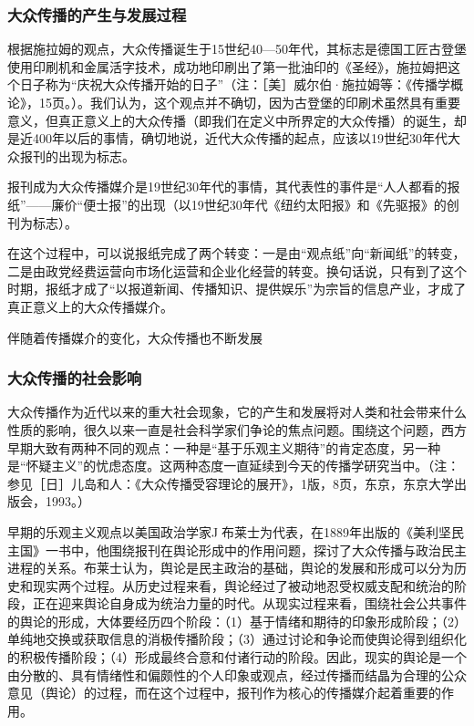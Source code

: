 \documentclass[UTF8,12pt]{ctexart}
\numberwithin{equation}{section} %
\numberwithin{figure}{section}
\numberwithin{table}{section}
\begin{document}
	
	\subsubsection{大众传播的产生与发展过程}
	根据施拉姆的观点，大众传播诞生于15世纪40—50年代，其标志是德国工匠古登堡使用印刷机和金属活字技术，成功地印刷出了第一批油印的《圣经》，施拉姆把这个日子称为“庆祝大众传播开始的日子”（注：［美］威尔伯·施拉姆等：《传播学概论》，15页。）。我们认为，这个观点并不确切，因为古登堡的印刷术虽然具有重要意义，但真正意义上的大众传播（即我们在定义中所界定的大众传播）的诞生，却是近400年以后的事情，确切地说，近代大众传播的起点，应该以19世纪30年代大众报刊的出现为标志。
	
	报刊成为大众传播媒介是19世纪30年代的事情，其代表性的事件是“人人都看的报纸”——廉价“便士报”的出现（以19世纪30年代《纽约太阳报》和《先驱报》的创刊为标志）。
	
	在这个过程中，可以说报纸完成了两个转变：一是由“观点纸”向“新闻纸”的转变，二是由政党经费运营向市场化运营和企业化经营的转变。换句话说，只有到了这个时期，报纸才成了“以报道新闻、传播知识、提供娱乐”为宗旨的信息产业，才成了真正意义上的大众传播媒介。
	
	伴随着传播媒介的变化，大众传播也不断发展
	
	\subsubsection{大众传播的社会影响}
	大众传播作为近代以来的重大社会现象，它的产生和发展将对人类和社会带来什么性质的影响，很久以来一直是社会科学家们争论的焦点问题。围绕这个问题，西方早期大致有两种不同的观点：一种是“基于乐观主义期待”的肯定态度，另一种是“怀疑主义”的忧虑态度。这两种态度一直延续到今天的传播学研究当中。（注：参见［日］儿岛和人：《大众传播受容理论的展开》，1版，8页，东京，东京大学出版会，1993。）
	
	早期的乐观主义观点以美国政治学家J布莱士为代表，在1889年出版的《美利坚民主国》一书中，他围绕报刊在舆论形成中的作用问题，探讨了大众传播与政治民主进程的关系。布莱士认为，舆论是民主政治的基础，舆论的发展和形成可以分为历史和现实两个过程。从历史过程来看，舆论经过了被动地忍受权威支配和统治的阶段，正在迎来舆论自身成为统治力量的时代。从现实过程来看，围绕社会公共事件的舆论的形成，大体要经历四个阶段：（1）基于情绪和期待的印象形成阶段；（2）单纯地交换或获取信息的消极传播阶段；（3）通过讨论和争论而使舆论得到组织化的积极传播阶段；（4）形成最终合意和付诸行动的阶段。因此，现实的舆论是一个由分散的、具有情绪性和偏颇性的个人印象或观点，经过传播而结晶为合理的公众意见（舆论）的过程，而在这个过程中，报刊作为核心的传播媒介起着重要的作用。
	
\end{document}
